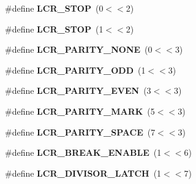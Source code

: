 \begin{DoxyCompactItemize}
\item 
\hypertarget{group__hal__dos_ga766df9edd07ffee6d4c425be00765c14}{\#define {\bfseries L\-C\-R\-\_\-S\-T\-O\-P}~(0$<$$<$2)}\label{group__hal__dos_ga766df9edd07ffee6d4c425be00765c14}

\item 
\hypertarget{group__hal__dos_gace2deeea42a791b868d540cf107da914}{\#define {\bfseries L\-C\-R\-\_\-S\-T\-O\-P}~(1$<$$<$2)}\label{group__hal__dos_gace2deeea42a791b868d540cf107da914}

\item 
\hypertarget{group__hal__dos_ga0a9c31abffbc2246670b81b11937db50}{\#define {\bfseries L\-C\-R\-\_\-\-P\-A\-R\-I\-T\-Y\-\_\-\-N\-O\-N\-E}~(0$<$$<$3)}\label{group__hal__dos_ga0a9c31abffbc2246670b81b11937db50}

\item 
\hypertarget{group__hal__dos_ga8153311f90845501a4dd0befc8e21574}{\#define {\bfseries L\-C\-R\-\_\-\-P\-A\-R\-I\-T\-Y\-\_\-\-O\-D\-D}~(1$<$$<$3)}\label{group__hal__dos_ga8153311f90845501a4dd0befc8e21574}

\item 
\hypertarget{group__hal__dos_gacda2ab112fb4dbffec4246609d3c1345}{\#define {\bfseries L\-C\-R\-\_\-\-P\-A\-R\-I\-T\-Y\-\_\-\-E\-V\-E\-N}~(3$<$$<$3)}\label{group__hal__dos_gacda2ab112fb4dbffec4246609d3c1345}

\item 
\hypertarget{group__hal__dos_ga25d8154ba512821b3da064c25f5eae42}{\#define {\bfseries L\-C\-R\-\_\-\-P\-A\-R\-I\-T\-Y\-\_\-\-M\-A\-R\-K}~(5$<$$<$3)}\label{group__hal__dos_ga25d8154ba512821b3da064c25f5eae42}

\item 
\hypertarget{group__hal__dos_gad37b540b9daa8a535548dff47ef92f72}{\#define {\bfseries L\-C\-R\-\_\-\-P\-A\-R\-I\-T\-Y\-\_\-\-S\-P\-A\-C\-E}~(7$<$$<$3)}\label{group__hal__dos_gad37b540b9daa8a535548dff47ef92f72}

\item 
\hypertarget{group__hal__dos_ga7c9aedd8591754a50e93d26d93b72fc8}{\#define {\bfseries L\-C\-R\-\_\-\-B\-R\-E\-A\-K\-\_\-\-E\-N\-A\-B\-L\-E}~(1$<$$<$6)}\label{group__hal__dos_ga7c9aedd8591754a50e93d26d93b72fc8}

\item 
\hypertarget{group__hal__dos_ga4357ee6d0bdd480b29fa7616d7571f45}{\#define {\bfseries L\-C\-R\-\_\-\-D\-I\-V\-I\-S\-O\-R\-\_\-\-L\-A\-T\-C\-H}~(1$<$$<$7)}\label{group__hal__dos_ga4357ee6d0bdd480b29fa7616d7571f45}


\end{DoxyCompactItemize}
